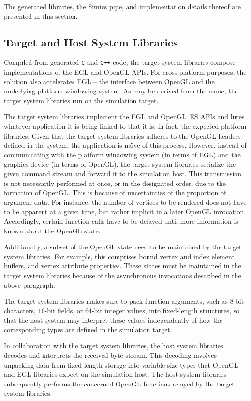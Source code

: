 \documentclass{article}
\begin{document}
The generated libraries, the Simics pipe, and implementation details thereof are presented in this section.

\subsection{Target and Host System Libraries}
\label{sec:proposedsolutionandimplementation_targetandhostsystemlibraries}
Compiled from generated \texttt{C} and \texttt{C++} code, the target system libraries compose implementations of the EGL and OpenGL APIs.
For cross-platform purposes, the solution also accelerates EGL -- the interface between OpenGL and the underlying platform windowing system.
As may be derived from the name, the target system libraries run on the simulation target.

The target system libraries implement the EGL and OpenGL~ES APIs and lures whatever application it is being linked to that it is, in fact, the expected platform libraries.
Given that the target system libraries adheres to the OpenGL headers defined in the system, the application is na\"{\i}ve of this process.
However, instead of communicating with the platform windowing system (in terms of EGL) and the graphics device (in terms of OpenGL), the target system libraries serialize the given command stream and forward it to the simulation host.
This transmission is not necessarily performed at once, or in the designated order, due to the formation of OpenGL.
This is because of uncertainties of the proportion of argument data.
For instance, the number of vertices to be rendered does not have to be apparent at a given time, but rather implicit in a later OpenGL invocation.
Accordingly, certain function calls have to be delayed until more information is known about the OpenGL state.

Additionally, a subset of the OpenGL state need to be maintained by the target system libraries.
For example, this comprises bound vertex and index element buffers, and vertex attribute properties.
These states must be maintained in the target system libraries because of the asynchronous invocations described in the above paragraph.

The target system libraries makes sure to pack function arguments, such as $8$-bit characters, $16$-bit fields, or $64$-bit integer values, into fixed-length structures, so that the host system may interpret these values independently of how the corresponding types are defined in the simulation target.

In collaboration with the target system libraries, the host system libraries decodes and interprets the received byte stream.
This decoding involves unpacking data from fixed length storage into variable-size types that OpenGL and EGL libraries expect on the simulation host.
The host system libraries subsequently performs the concerned OpenGL functions relayed by the target system libraries.
\end{document}
